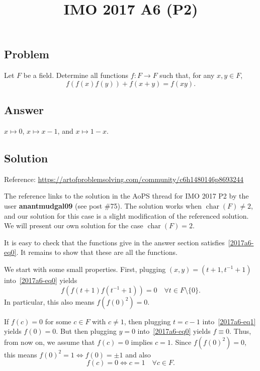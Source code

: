 \documentclass{article}
\title{IMO 2017 A6 (P2)}
\author{}
\date{}
\DeclareMathOperator{\rchar}{char}
\begin{document}
\maketitle



\subsection*{Problem}

Let $F$ be a field.
Determine all functions $f : F \to F$ such that, for any $x, y \in F$,
\[ f(f(x) f(y)) + f(x + y) = f(xy). \tag{*}\label{2017a6-eq0} \]



\subsection*{Answer}

$x \mapsto 0$, $x \mapsto x - 1$, and $x \mapsto 1 - x$.



\subsection*{Solution}

Reference: \url{https://artofproblemsolving.com/community/c6h1480146p8693244}

The reference links to the solution in the AoPS thread for IMO 2017 P2 by the user \textbf{anantmudgal09} (see post \#75).
The solution works when $\rchar(F) \neq 2$, and our solution for this case is a slight modification of the referenced solution.
We will present our own solution for the case $\rchar(F) = 2$.

It is easy to check that the functions give in the answer section satisfies~\eqref{2017a6-eq0}.
It remains to show that these are all the functions.

We start with some small properties.
First, plugging $(x, y) = (t + 1, t^{-1} + 1)$ into~\eqref{2017a6-eq0} yields
\[ f(f(t + 1) f(t^{-1} + 1)) = 0 \quad \forall t \in F \setminus \{0\}. \tag{1}\label{2017a6-eq1} \]
In particular, this also means $f(f(0)^2) = 0$.

If $f(c) = 0$ for some $c \in F$ with $c \neq 1$, then plugging $t = c - 1$ into~\eqref{2017a6-eq1} yields $f(0) = 0$.
But then plugging $y = 0$ into~\eqref{2017a6-eq0} yields $f \equiv 0$.
Thus, from now on, we assume that $f(c) = 0$ implies $c = 1$.
Since $f(f(0)^2) = 0$, this means $f(0)^2 = 1 \iff f(0) = \pm 1$ and also
\[ f(c) = 0 \iff c = 1 \quad \forall c \in F. \tag{2}\label{2017a6-eq2} \]
\end{document}
